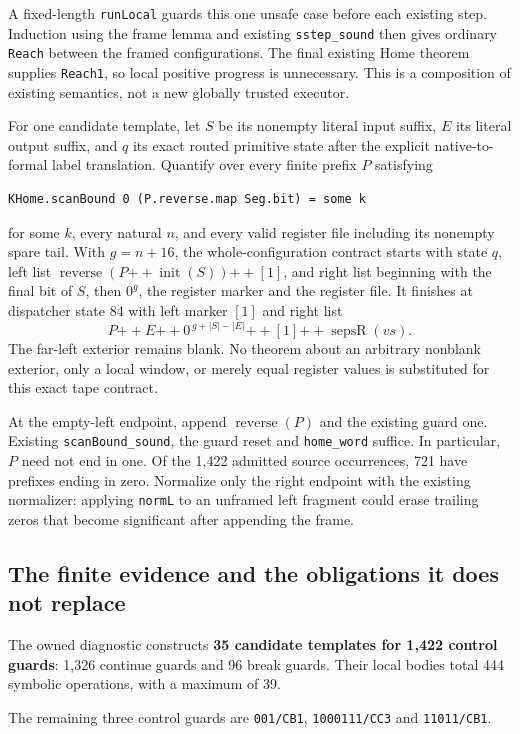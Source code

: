 \documentclass[11pt]{article}
\newcommand{\code}[1]{\texttt{#1}}
\begin{document}
A fixed-length \code{runLocal} guards this one unsafe case before each existing step. Induction using the frame lemma and existing \code{sstep\_sound} then gives ordinary \code{Reach} between the framed configurations. The final existing Home theorem supplies \code{Reach1}, so local positive progress is unnecessary. This is a composition of existing semantics, not a new globally trusted executor.

For one candidate template, let $S$ be its nonempty literal input suffix, $E$ its literal output suffix, and $q$ its exact routed primitive state after the explicit native-to-formal label translation. Quantify over every finite prefix $P$ satisfying
\begin{verbatim}
KHome.scanBound 0 (P.reverse.map Seg.bit) = some k
\end{verbatim}
for some $k$, every natural $n$, and every valid register file including its nonempty spare tail. With $g=n+16$, the whole-configuration contract starts with state $q$, left list
$\operatorname{reverse}(P\mathbin{+\!+}\operatorname{init}(S))\mathbin{+\!+}[1]$,
and right list beginning with the final bit of $S$, then $0^g$, the register marker and the register file. It finishes at dispatcher state 84 with left marker $[1]$ and right list
\[
 P\mathbin{+\!+}E\mathbin{+\!+}0^{\,g+|S|-|E|}
 \mathbin{+\!+}[1]\mathbin{+\!+}\operatorname{sepsR}(vs).
\]
The far-left exterior remains blank. No theorem about an arbitrary nonblank exterior, only a local window, or merely equal register values is substituted for this exact tape contract.

At the empty-left endpoint, append $\operatorname{reverse}(P)$ and the existing guard one. Existing \code{scanBound\_sound}, the guard reset and \code{home\_word} suffice. In particular, $P$ need not end in one. Of the 1,422 admitted source occurrences, 721 have prefixes ending in zero. Normalize only the right endpoint with the existing normalizer: applying \code{normL} to an unframed left fragment could erase trailing zeros that become significant after appending the frame.

\subsection{The finite evidence and the obligations it does not replace}
The owned diagnostic constructs \textbf{35 candidate templates for 1,422 control guards}: 1,326 continue guards and 96 break guards. Their local bodies total 444 symbolic operations, with a maximum of 39. \par\nopagebreak
The remaining three control guards are \code{001/CB1}, \code{1000111/CC3} and \code{11011/CB1}.
\end{document}
